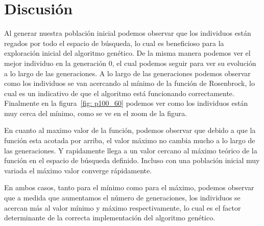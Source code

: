 \section{Discusión}

Al generar nuestra población inicial podemos observar que los individuos están regados
por todo el espacio de búsqueda, lo cual es beneficioso para la exploración inicial
del algoritmo genético. De la misma manera podemos ver el mejor individuo en la
generación 0, el cual podemos seguir para ver su evolución a lo largo de las 
generaciones. A lo largo de las generaciones podemos observar como los individuos 
se van acercando al mínimo de la función de Rosenbrock, lo cual es un indicativo
de que el algoritmo está funcionando correctamente. Finalmente en la figura~\ref{fig: p100_60} 
podemos ver como los individuos están muy cerca del mínimo, como se ve en el zoom de la figura.

En cuanto al maximo valor de la función, podemos observar que debido a que la función esta acotada
por arriba, el valor máximo no cambia mucho a lo largo de las generaciones. Y rapidamente 
llega a un valor cercano al máximo teórico de la función en el espacio de búsqueda definido. 
Incluso con una población inicial muy variada el máximo valor converge rápidamente.

En ambos casos, tanto para el mínimo como para el máximo, podemos observar que a medida que
aumentamos el número de generaciones, los individuos se acercan más al valor mínimo y máximo
respectivamente, lo cual es el factor determinante de la correcta implementación del algoritmo genético.